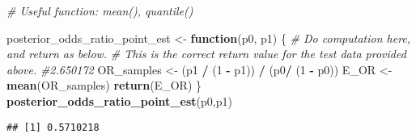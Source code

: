 \documentclass[
]{article}
\newenvironment{Shaded}{\begin{snugshade}}{\end{snugshade}}
\newcommand{\CommentTok}[1]{\textcolor[rgb]{0.56,0.35,0.01}{\textit{#1}}}
\newcommand{\ControlFlowTok}[1]{\textcolor[rgb]{0.13,0.29,0.53}{\textbf{#1}}}
\newcommand{\DecValTok}[1]{\textcolor[rgb]{0.00,0.00,0.81}{#1}}
\newcommand{\FunctionTok}[1]{\textcolor[rgb]{0.13,0.29,0.53}{\textbf{#1}}}
\newcommand{\NormalTok}[1]{#1}
\newcommand{\OtherTok}[1]{\textcolor[rgb]{0.56,0.35,0.01}{#1}}
\newcommand{\SpecialCharTok}[1]{\textcolor[rgb]{0.81,0.36,0.00}{\textbf{#1}}}
\begin{document}
\begin{Shaded}
\begin{Highlighting}[]
\CommentTok{\# Useful function: mean(), quantile()}

\NormalTok{posterior\_odds\_ratio\_point\_est }\OtherTok{\textless{}{-}} \ControlFlowTok{function}\NormalTok{(p0, p1) \{}
    \CommentTok{\# Do computation here, and return as below.}
    \CommentTok{\# This is the correct return value for the test data provided above.}
    \CommentTok{\#2.650172}
\NormalTok{    OR\_samples }\OtherTok{\textless{}{-}}\NormalTok{ (p1 }\SpecialCharTok{/}\NormalTok{ (}\DecValTok{1} \SpecialCharTok{{-}}\NormalTok{ p1)) }\SpecialCharTok{/}\NormalTok{ (p0}\SpecialCharTok{/}\NormalTok{ (}\DecValTok{1} \SpecialCharTok{{-}}\NormalTok{ p0))}
\NormalTok{    E\_OR }\OtherTok{\textless{}{-}} \FunctionTok{mean}\NormalTok{(OR\_samples)}
    \FunctionTok{return}\NormalTok{(E\_OR)}
\NormalTok{\}}
\FunctionTok{posterior\_odds\_ratio\_point\_est}\NormalTok{(p0,p1) }
\end{Highlighting}
\end{Shaded}

\begin{verbatim}
## [1] 0.5710218
\end{verbatim}
\end{document}
